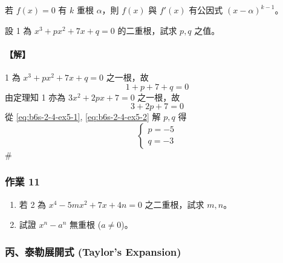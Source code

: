 \begin{corollary}\label{cor:b6s-2-gcd-root}
若 $f(x)=0$ 有 $k$ 重根 $\alpha$，則 $f(x)$ 與 $f'(x)$ 有公因式 $(x-\alpha)^{k-1}$。
\end{corollary}

\begin{example}\label{ex:b6s-2-18}
設 1 為 $x^3+px^2+7x+q=0$ 的二重根，試求 $p, q$ 之值。
\end{example}

\paragraph{【解】}
1 為 $x^3+px^2+7x+q=0$ 之一根，故
\begin{equation}
1 + p + 7 + q = 0 \label{eq:b6s-2-4-ex5-1}
\end{equation}
由定理知 1 亦為 $3x^2+2px+7=0$ 之一根，故
\begin{equation}
3 + 2p + 7 = 0 \label{eq:b6s-2-4-ex5-2}
\end{equation}
從 \eqref{eq:b6s-2-4-ex5-1}, \eqref{eq:b6s-2-4-ex5-2} 解 $p, q$ 得
\[ \begin{cases} p = -5 \\ q = -3 \end{cases} \]\hfill$\#$

\subsubsection*{作業 11}\label{hw:b6s-2-11}
\begin{enumerate}[label=(\roman*), leftmargin=2em]
  \item 若 2 為 $x^4-5mx^2+7x+4n=0$ 之二重根，試求 $m, n$。
  \item 試證 $x^n-a^n$ 無重根 ($a \ne 0$)。
\end{enumerate}

\subsubsection*{丙、泰勒展開式 (Taylor's Expansion)}\label{subsec:b6s-2-4-c}


